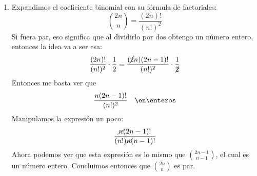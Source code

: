 \begin{enumerate}[label=\alph*)]
  \item
        Expandimos el coeficiente binomial con su fórmula de factoriales:
        $$
          \binom{2n}{n} = \frac{(2n)!}{(n!)^2}
        $$
        Si fuera par, eso significa que al dividirlo por dos obtengo un número entero, entonces la idea va a ser esa:
        $$
          \frac{(2n)!}{(n!)^2} \cdot \frac{1}{2} = \frac{(\cancel{2}n)(2n-1)!}{(n!)^2} \cdot \frac{1}{\cancel{2}}
        $$
        Entonces me basta ver que
        $$
          \frac{n(2n-1)!}{(n!)^2} \quad \en \enteros
        $$
        Manipulamos la expresión un poco:
        $$
          \frac{\cancel{n}(2n-1)!}{(n!)\cancel{n}(n-1)!}
        $$
        Ahora podemos ver que esta expresión es lo mismo que $\binom{2n-1}{n-1}$, el cual es un número entero. Concluimos
        entonces que $\binom{2n}{n}$ es par.


\end{enumerate}

\begin{aportes}
  \item {}
\end{aportes}
